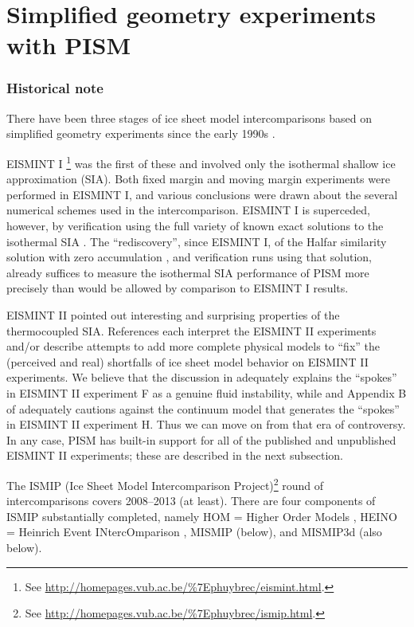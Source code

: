 
\section{Simplified geometry experiments with PISM}\label{sec:simp}

\subsubsection*{Historical note}  There have been three stages of ice sheet model intercomparisons based on simplified geometry experiments since the early 1990s \cite{BuelerSpray}.

EISMINT I \cite[ European Ice Sheet Modeling INiTiative]{EISMINT96}\footnote{See \url{http://homepages.vub.ac.be/\%7Ephuybrec/eismint.html}.} was the first of these and involved only the isothermal shallow ice approximation (SIA).  Both fixed margin and moving margin experiments were performed in EISMINT I, and various conclusions were drawn about the several numerical schemes used in the intercomparison.  EISMINT I is superceded, however, by verification using the full variety of known exact solutions to the isothermal SIA \cite{BLKCB}.  The ``rediscovery'', since EISMINT I, of the Halfar similarity solution with zero accumulation \cite{Halfar83}, and verification runs using that solution, already suffices to measure the isothermal SIA performance of PISM more precisely than would be allowed by comparison to EISMINT I results.

EISMINT II \cite{EISMINT00} pointed out interesting and surprising properties of the thermocoupled SIA.  References \cite{BBL,Hindmarsh04,Hindmarsh06,PayneBaldwin,SaitoEISMINT,BBssasliding} each interpret the EISMINT II experiments and/or describe attempts to add more complete physical models to ``fix'' the (perceived and real) shortfalls of ice sheet model behavior on EISMINT II experiments.  We believe that the discussion in \cite{PayneDongelmans,PayneBaldwin,BBL} adequately explains the ``spokes'' in EISMINT II experiment F as a genuine fluid instability, while \cite{Fowler01} and Appendix B of \cite{BBssasliding} adequately cautions against the continuum model that generates the ``spokes'' in EISMINT II experiment H.   Thus we can move on from that era of controversy.  In any case, PISM has built-in support for all of the published and unpublished EISMINT II experiments; these are described in the next subsection.

The ISMIP (Ice Sheet Model Intercomparison Project)\footnote{See \url{http://homepages.vub.ac.be/\%7Ephuybrec/ismip.html}.} round of intercomparisons covers 2008--2013 (at least).  There are four components of ISMIP substantially completed, namely HOM = Higher Order Models \cite{ISMIPHOM,HOMelmer}, HEINO = Heinrich Event INtercOmparison \cite{GreveTakahamaCalov,Calovetal2009HEINOfinal}, MISMIP (below), and MISMIP3d (also below).

